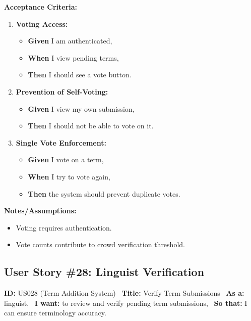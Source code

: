 \documentclass[12pt]{article}
\begin{document}
\vspace{1em}
\textbf{Acceptance Criteria:}
\begin{enumerate}
\item \textbf{Voting Access:}
\begin{itemize}
\item \textbf{Given} I am authenticated,
\item \textbf{When} I view pending terms,
\item \textbf{Then} I should see a vote button.
\end{itemize}

\item \textbf{Prevention of Self-Voting:}
\begin{itemize}
    \item \textbf{Given} I view my own submission,
    \item \textbf{Then} I should not be able to vote on it.
\end{itemize}

\item \textbf{Single Vote Enforcement:}
\begin{itemize}
    \item \textbf{Given} I vote on a term,
    \item \textbf{When} I try to vote again,
    \item \textbf{Then} the system should prevent duplicate votes.
\end{itemize}
\end{enumerate}

\vspace{1em}
\textbf{Notes/Assumptions:}
\begin{itemize}
\item Voting requires authentication.
\item Vote counts contribute to crowd verification threshold.
\end{itemize}

\subsection{User Story \#28: Linguist Verification}
\textbf{ID:} US028 (Term Addition System) \
\textbf{Title:} Verify Term Submissions \
\textbf{As a:} linguist, \
\textbf{I want:} to review and verify pending term submissions, \
\textbf{So that:} I can ensure terminology accuracy.
\end{document}
